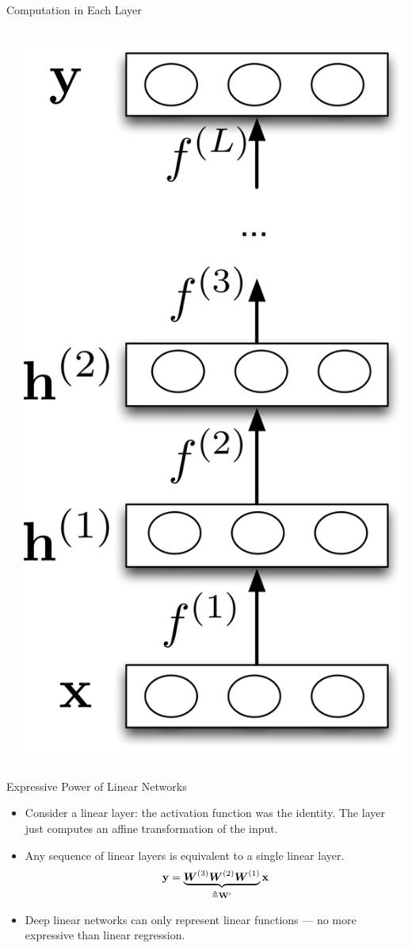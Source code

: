 \documentclass[11pt,handout,aspectratio=169]{beamer}
\begin{document}
\begin{frame}{Computation in Each Layer}
\begin{columns}
\begin{column}{0.75\linewidth}
\end{column}
\begin{column}{0.35\linewidth}
    \centering
      \includegraphics[width=.7\linewidth]{pics/layer_functions.png}
\end{column}
\end{columns}
\end{frame}


\begin{frame}{Expressive Power of Linear Networks}
  \begin{itemize}
  \setlength\itemsep{1em}
  \item Consider a linear layer: the activation function was the identity. The layer just computes an affine transformation of the input.
  \item Any sequence of linear layers is equivalent to a single linear layer.
    \[ \mathbf{y} = \underbrace{\boldsymbol W^{(3)} \boldsymbol W^{(2)} \boldsymbol W^{(1)}}_{\triangleq \mathbf{W}^\prime} \mathbf{x} \]
\item Deep linear networks can only represent linear functions 
--- no more expressive than linear regression.
  \end{itemize}
\end{frame}
\end{document}
